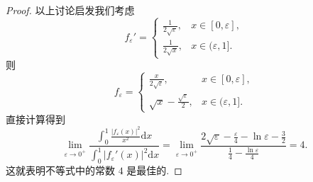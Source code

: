 \documentclass[../../main.tex]{subfiles}
\begin{document}
\begin{proof}
以上讨论启发我们考虑
$$f_\varepsilon' = \begin{cases} 
\frac{1}{2\sqrt{\varepsilon}}, & x \in [0, \varepsilon], \\
\frac{1}{2\sqrt{x}}, & x \in (\varepsilon, 1].
\end{cases}$$
则
$$f_\varepsilon = \begin{cases} 
\frac{x}{2\sqrt{\varepsilon}}, & x \in [0, \varepsilon], \\
\sqrt{x} - \frac{\sqrt{\varepsilon}}{2}, & x \in (\varepsilon, 1].
\end{cases}$$
直接计算得到
$$\lim_{\varepsilon \to 0^+} \frac{\int_0^1 \frac{|f_\varepsilon(x)|^2}{x^2} \mathrm{d}x}{\int_0^1 |f_\varepsilon'(x)|^2 \mathrm{d}x} = \lim_{\varepsilon \to 0^+} \frac{2\sqrt{\varepsilon} - \frac{\varepsilon}{4} - \ln \varepsilon - \frac{3}{2}}{\frac{1}{4} - \frac{\ln \varepsilon}{4}} = 4.$$
这就表明不等式中的常数 $4$ 是最佳的.
\end{proof}
\end{document}
